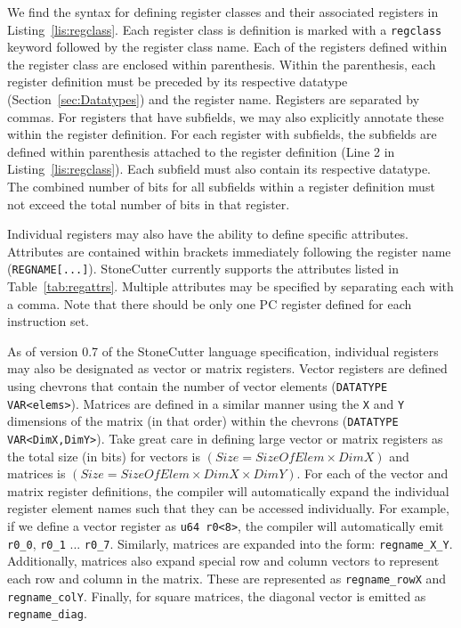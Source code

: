 \documentclass{article}
\begin{document}
We find the syntax for defining register classes and their associated registers in Listing~\ref{lis:regclass}.  Each register 
class is definition is marked with a \texttt{regclass} keyword followed by the register class name.  Each of the registers 
defined within the register class are enclosed within parenthesis.  Within the parenthesis, each register definition must 
be preceded by its respective datatype (Section~\ref{sec:Datatypes}) and the register name.  Registers are separated 
by commas.  For registers that have subfields, we may also explicitly annotate these within the register definition.  For 
each register with subfields, the subfields are defined within parenthesis attached to the register definition 
(Line 2 in Listing~\ref{lis:regclass}).  Each subfield must also contain its respective datatype.  The combined number of bits for 
all subfields within a register definition must not exceed the total number of bits in that register.  

Individual registers may also have the ability to define specific attributes.  Attributes are contained within brackets immediately 
following the register name (\texttt{REGNAME[...]}).  StoneCutter currently supports the attributes listed in Table~\ref{tab:regattrs}.  Multiple attributes may be specified by separating each with a comma.  Note that there should be only one PC register defined for each instruction 
set.

As of version 0.7 of the StoneCutter language specification, individual registers may also be designated as vector or matrix registers.  Vector 
registers are defined using chevrons that contain the number of vector elements (\texttt{DATATYPE VAR<elems>}).  Matrices are defined 
in a similar manner using the \texttt{X} and \texttt{Y} dimensions of the matrix (in that order) within the chevrons (\texttt{DATATYPE VAR<DimX,DimY>}).  Take 
great care in defining large vector or matrix registers as the total size (in bits) for vectors is $(Size = SizeOfElem \times DimX)$ and matrices is $(Size = SizeOfElem \times DimX \times DimY)$.  For each of the vector and matrix register definitions, the compiler will automatically expand the individual register element names such that 
they can be accessed individually.  For example, if we define a vector register as \texttt{u64 r0<8>}, the compiler will automatically emit \texttt{r0\_0}, \texttt{r0\_1} ... 
\texttt{r0\_7}.  Similarly, matrices are expanded into the form: \texttt{regname\_X\_Y}.  Additionally, matrices also expand special 
row and column vectors to represent each row and column in the matrix.  These are represented as \texttt{regname\_rowX} and \texttt{regname\_colY}.  Finally, for square 
matrices, the diagonal vector is emitted as \texttt{regname\_diag}.  
\end{document}
